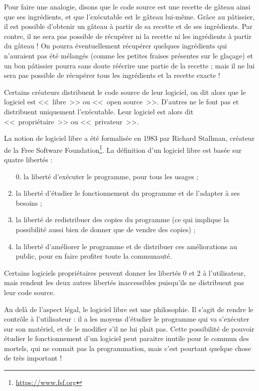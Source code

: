 Pour faire une analogie, disons que le code source est une recette de gâteau ainsi que ses ingrédients, et que l'exécutable est le gâteau lui-même.
Grâce au pâtissier, il est possible d'obtenir un gâteau à partir de sa recette et de ses ingrédients.
Par contre, il ne sera pas possible de récupérer ni la recette ni les ingrédients à partir du gâteau !
On pourra éventuellement récupérer quelques ingrédients qui n'auraient pas été mélangés (comme les petites fraises présentes sur le glaçage) et un bon pâtissier pourra sans doute réécrire une partie de la recette ; mais il ne lui sera pas possible de récupérer tous les ingrédients et la recette exacte !

Certains créateurs distribuent le code source de leur logiciel, on dit alors que le logiciel est <<~libre~>> ou <<~open source~>>.
D'autres ne le font pas et distribuent uniquement l'exécutable.
Leur logiciel est alors dit <<~propriétaire~>> ou <<~privateur~>>.

La notion de logiciel libre a été formalisée en 1983 par Richard Stallman, créateur de la Free Software Foundation\footnote{\url{https://www.fsf.org}}.
La définition d'un logiciel libre est basée sur quatre libertés :

\begin{enumerate}
\item[0.] la liberté d'exécuter le programme, pour tous les usages ;
\item la liberté d'étudier le fonctionnement du programme et de l'adapter à ses besoins ;
\item la liberté de redistribuer des copies du programme (ce qui implique la possibilité aussi bien de donner que de vendre des copies) ;
\item la liberté d'améliorer le programme et de distribuer ces améliorations au public, pour en faire profiter toute la communauté.
\end{enumerate}

Certains logiciels propriétaires peuvent donner les libertés \no{}0 et \no{}2 à l'utilisateur, mais rendent les deux autres libertés inaccessibles puisqu'ils ne distribuent pas leur code source.

Au delà de l'aspect légal, le logiciel libre est une philosophie.
Il s'agit de rendre le contrôle à l'utilisateur : il a les moyens d'étudier le programme qui va s'exécuter sur son matériel, et de le modifier s'il ne lui plait pas.
Cette possibilité de pouvoir étudier le fonctionnement d'un logiciel peut paraitre inutile pour le commun des mortels, qui ne connait pas la programmation, mais c'est pourtant quelque chose de très important !

